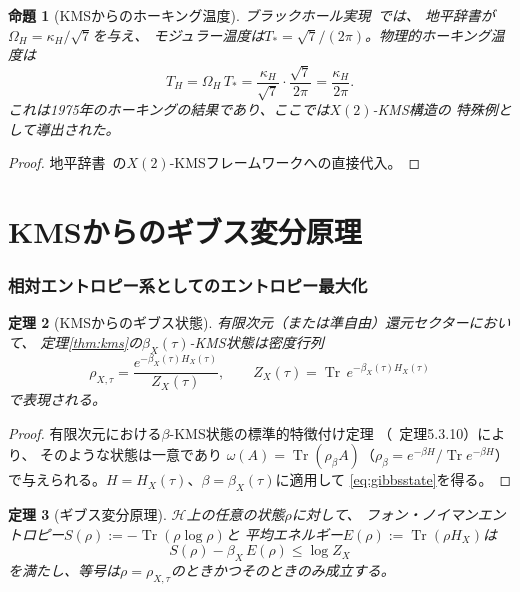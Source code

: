 \documentclass[12pt]{article}
\theoremstyle{plain}
\newtheorem{theorem}{定理}[section]
\newtheorem{proposition}[theorem]{命題}
\theoremstyle{definition}
\numberwithin{equation}{section}
\DeclareMathOperator{\Tr}{Tr}
\begin{document}
\begin{proposition}[KMSからのホーキング温度]\label{prop:hawking}
ブラックホール実現~\cite{ParticleCosmo}では、
地平辞書が$\Omega_H=\kappa_H/\sqrt{7}$を与え、
モジュラー温度は$T_*=\sqrt{7}/(2\pi)$。物理的ホーキング温度は
\begin{equation}
T_H = \Omega_H\,T_* = \frac{\kappa_H}{\sqrt{7}}\cdot\frac{\sqrt{7}}{2\pi}
= \frac{\kappa_H}{2\pi}.
\end{equation}
これは1975年のホーキングの結果であり、ここでは$X(2)$-KMS構造の
特殊例として導出された。
\end{proposition}

\begin{proof}
地平辞書~\cite{ParticleCosmo}の$X(2)$-KMSフレームワークへの直接代入。
\end{proof}


\part{KMSからのギブス変分原理}

\section{相対エントロピー系としてのエントロピー最大化}\label{sec:gibbs}

\begin{theorem}[KMSからのギブス状態]\label{thm:gibbs}
有限次元（または準自由）還元セクターにおいて、
定理\ref{thm:kms}の$\beta_X(\tau)$-KMS状態は密度行列
\begin{equation}\label{eq:gibbsstate}
\rho_{X,\tau} = \frac{e^{-\beta_X(\tau)H_X(\tau)}}{Z_X(\tau)},
\qquad
Z_X(\tau) = \Tr\,e^{-\beta_X(\tau)H_X(\tau)}
\end{equation}
で表現される。
\end{theorem}

\begin{proof}
有限次元における$\beta$-KMS状態の標準的特徴付け定理
（~\cite{BratteliRobinson}定理5.3.10）により、
そのような状態は一意であり
$\omega(A)=\Tr(\rho_\beta A)$（$\rho_\beta=e^{-\beta H}/\Tr e^{-\beta H}$）
で与えられる。$H=H_X(\tau)$、$\beta=\beta_X(\tau)$に適用して
\eqref{eq:gibbsstate}を得る。
\end{proof}

\begin{theorem}[ギブス変分原理]\label{thm:gibbsvar}
$\mathcal{H}$上の任意の状態$\rho$に対して、
フォン・ノイマンエントロピー$S(\rho):=-\Tr(\rho\log\rho)$と
平均エネルギー$E(\rho):=\Tr(\rho H_X)$は
\begin{equation}\label{eq:variational}
S(\rho)-\beta_X\,E(\rho) \leq \log Z_X
\end{equation}
を満たし、等号は$\rho=\rho_{X,\tau}$のときかつそのときのみ成立する。
\end{theorem}
\end{document}
